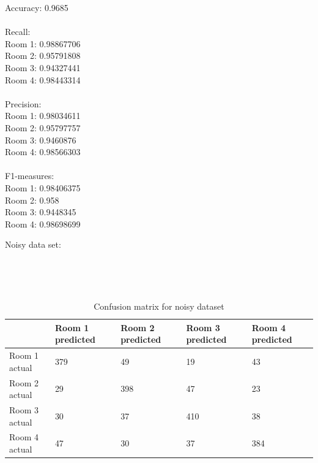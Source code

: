 \documentclass{article}
\begin{document}
Accuracy: 0.9685 \\
\\
Recall: \\
Room 1: 0.98867706 \\
Room 2: 0.95791808 \\
Room 3: 0.94327441 \\
Room 4: 0.98443314 \\
\\
Precision: \\
Room 1: 0.98034611 \\
Room 2: 0.95797757 \\
Room 3: 0.9460876 \\
Room 4: 0.98566303 \\
\\
F1-measures: \\
Room 1: 0.98406375 \\
Room 2: 0.958  \\
Room 3: 0.9448345 \\
Room 4: 0.98698699 \\
\pagebreak 

\begin{center}
Noisy data set:
\end{center}
  \\

\begin{table}[htb]
  \caption{Confusion matrix for noisy dataset} \\
  \begin{tabular}{|l|l|l|l|l|}
  \hline
                & Room 1 predicted & Room 2 predicted & Room 3 predicted & Room 4 predicted \\ \hline
  Room 1 actual & 379              & 49               & 19               & 43               \\ \hline
  Room 2 actual & 29               & 398              & 47               & 23               \\ \hline
  Room 3 actual & 30               & 37               & 410              & 38               \\ \hline
  Room 4 actual & 47               & 30               & 37               & 384              \\ \hline
  \end{tabular}
\end{table}
\end{document}
